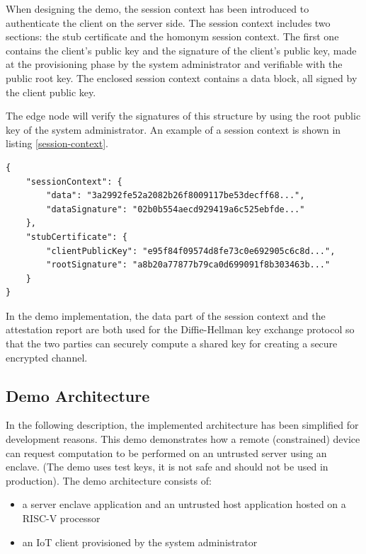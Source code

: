 When designing the demo, the session context has been introduced to authenticate the client on the server side. The session context includes two sections: the stub certificate and the homonym session context. The first one contains the client's public key and the signature of the client's public key, made at the provisioning phase by the system administrator and verifiable with the public root key. The enclosed session context contains a data block, all signed by the client public key. 

The edge node will verify the signatures of this structure by using the root public key of the system administrator. An example of a session context is shown in listing \ref{session-context}. \\

\begin{lstlisting}[caption={Example of a session context generated by the client},captionpos=b,style=json, label={session-context},frame=single]
{
    "sessionContext": {
        "data": "3a2992fe52a2082b26f8009117be53decff68...",
        "dataSignature": "02b0b554aecd929419a6c525ebfde..."
    },
    "stubCertificate": {
        "clientPublicKey": "e95f84f09574d8fe73c0e692905c6c8d...",
        "rootSignature": "a8b20a77877b79ca0d699091f8b303463b..."
    }
}
\end{lstlisting}

In the demo implementation, the data part of the session context and the attestation report are both used for the Diffie-Hellman key exchange protocol so that the two parties can securely compute a shared key for creating a secure encrypted channel. 

\subsection{Demo Architecture}
In the following description, the implemented architecture has been simplified for development reasons. This demo demonstrates how a remote (constrained) device can request computation to be performed on an untrusted server using an enclave. (The demo uses test keys, it is not safe and should not be used in production). The demo architecture consists of:
\begin{itemize}
    \item a server enclave application and an untrusted host application hosted on a RISC-V processor
    \item an IoT client provisioned by the system administrator  
\end{itemize} 

